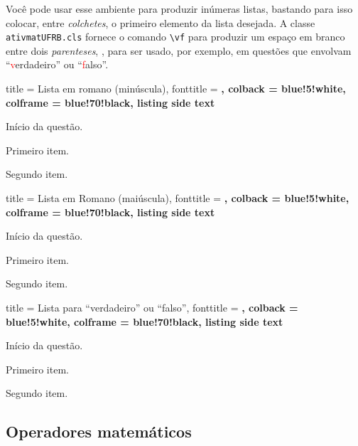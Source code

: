 Você pode usar esse ambiente para produzir inúmeras listas, bastando para isso
colocar, entre \textit{colchetes}, o primeiro elemento da lista desejada.
A classe \texttt{ativmatUFRB.cls} fornece o comando \verb|\vf| para produzir um
espaço em branco entre dois \textit{parenteses}, \vf, para ser usado, por 
exemplo, em questões que envolvam ``\textcolor{red}{v}erdadeiro'' ou
``\textcolor{red}{f}also''. 

\begin{tcblisting}
{
  title     = Lista em romano (minúscula),
  fonttitle = \bfseries,
  colback   = blue!5!white,
  colframe  = blue!70!black,
  listing side text
}
\begin{atividade}
\questao Início da questão.
\begin{itens}[(i)]
 \item Primeiro item.
 \item Segundo item.
\end{itens}
\end{atividade}
\end{tcblisting}


\begin{tcblisting}
{
  title     = Lista em Romano (maiúscula),
  fonttitle = \bfseries,
  colback   = blue!5!white,
  colframe  = blue!70!black,
  listing side text
}
\begin{atividade}
\questao Início da questão.
\begin{itens}[(I)]
 \item Primeiro item.
 \item Segundo item.
\end{itens}
\end{atividade}
\end{tcblisting}

\begin{tcblisting}
{
  title     = Lista para ``verdadeiro'' ou ``falso'',
  fonttitle = \bfseries,
  colback   = blue!5!white,
  colframe  = blue!70!black,
  listing side text
}
\begin{atividade}
\questao Início da questão.
\begin{itens}[\vf]
 \item Primeiro item.
 \item Segundo item.
\end{itens}
\end{atividade}
\end{tcblisting}

\subsection{Operadores matemáticos}

